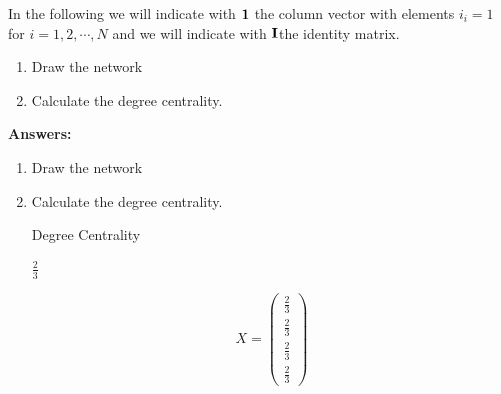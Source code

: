 \documentclass{amsart}
\theoremstyle{definition}
\theoremstyle{remark}
\numberwithin{equation}{section}
\begin{document}
\begin{enumerate}
\vspace{0.2cm}
In the following we will indicate with ${\bf 1}$ the column vector with elements $i_i = 1$ for $i = 1, 2, \cdots, N$ and we will indicate with ${\bf I}$the identity matrix. \vspace{0.2cm}
\begin{enumerate}
\item Draw the network
\item Calculate the degree centrality.
\end{enumerate}
\vspace{1cm}

\textbf{Answers:}

\begin{enumerate}
\item Draw the network \vspace{0.2cm}


\vspace{0.2cm}
\item Calculate the degree centrality. \vspace{0.2cm}

Degree Centrality \vspace{0.2cm}

$\frac{2}{3}$ \vspace{0.2cm}

\begin{equation*}
    {X}  = 
    \begin{pmatrix} 
        \frac{2}{3} \\ 
        \frac{2}{3} \\ 
        \frac{2}{3} \\ 
        \frac{2}{3}
    \end{pmatrix}
\end{equation*} \vspace{0.2cm}


\end{enumerate}
\end{enumerate}
\end{document}
